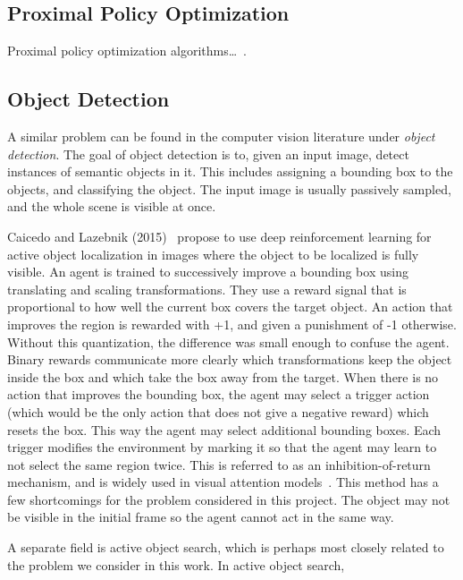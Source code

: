 \subsection{Proximal Policy Optimization}

Proximal policy optimization algorithms\dots~\cite{schulman_ppo_2017}.

\subsection{Object Detection}


A similar problem can be found in the computer vision literature under \textit{object detection}.
The goal of object detection is to, given an input image, detect instances of semantic objects in it.
This includes assigning a bounding box to the objects, and classifying the object.
The input image is usually passively sampled, and the whole scene is visible at once.

Caicedo and Lazebnik (2015)~\cite{caicedo_active_2015} propose to use deep reinforcement learning for active object localization in images where the object to be localized is fully visible.
An agent is trained to successively improve a bounding box using translating and scaling transformations.
They use a reward signal that is proportional to how well the current box covers the target object.
An action that improves the region is rewarded with +1, and given a punishment of -1 otherwise.
Without this quantization, the difference was small enough to confuse the agent.
Binary rewards communicate more clearly which transformations keep the object inside the box and which take the box away from the target.
When there is no action that improves the bounding box, the agent may select a trigger action (which would be the only action that does not give a negative reward) which resets the box.
This way the agent may select additional bounding boxes.
Each trigger modifies the environment by marking it so that the agent may learn to not select the same region twice.
This is referred to as an inhibition-of-return mechanism, and is widely used in visual attention models~\cite{[16] in caicedo_active_2015}.
This method has a few shortcomings for the problem considered in this project.
The object may not be visible in the initial frame so the agent cannot act in the same way. 

A separate field is active object search, which is perhaps most closely related to the problem we consider in this work.
In active object search, %

